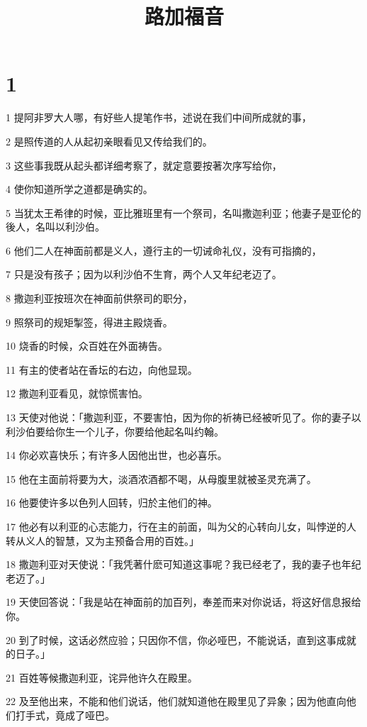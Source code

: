 

\title{路加福音}


\chapter{1}

\par 1 提阿非罗大人哪，有好些人提笔作书，述说在我们中间所成就的事，
\par 2 是照传道的人从起初亲眼看见又传给我们的。
\par 3 这些事我既从起头都详细考察了，就定意要按著次序写给你，
\par 4 使你知道所学之道都是确实的。
\par 5 当犹太王希律的时候，亚比雅班里有一个祭司，名叫撒迦利亚；他妻子是亚伦的後人，名叫以利沙伯。
\par 6 他们二人在神面前都是义人，遵行主的一切诫命礼仪，没有可指摘的，
\par 7 只是没有孩子；因为以利沙伯不生育，两个人又年纪老迈了。
\par 8 撒迦利亚按班次在神面前供祭司的职分，
\par 9 照祭司的规矩掣签，得进主殿烧香。
\par 10 烧香的时候，众百姓在外面祷告。
\par 11 有主的使者站在香坛的右边，向他显现。
\par 12 撒迦利亚看见，就惊慌害怕。
\par 13 天使对他说：「撒迦利亚，不要害怕，因为你的祈祷已经被听见了。你的妻子以利沙伯要给你生一个儿子，你要给他起名叫约翰。
\par 14 你必欢喜快乐；有许多人因他出世，也必喜乐。
\par 15 他在主面前将要为大，淡酒浓酒都不喝，从母腹里就被圣灵充满了。
\par 16 他要使许多以色列人回转，归於主他们的神。
\par 17 他必有以利亚的心志能力，行在主的前面，叫为父的心转向儿女，叫悖逆的人转从义人的智慧，又为主预备合用的百姓。」
\par 18 撒迦利亚对天使说：「我凭著什麽可知道这事呢？我已经老了，我的妻子也年纪老迈了。」
\par 19 天使回答说：「我是站在神面前的加百列，奉差而来对你说话，将这好信息报给你。
\par 20 到了时候，这话必然应验；只因你不信，你必哑巴，不能说话，直到这事成就的日子。」
\par 21 百姓等候撒迦利亚，诧异他许久在殿里。
\par 22 及至他出来，不能和他们说话，他们就知道他在殿里见了异象；因为他直向他们打手式，竟成了哑巴。
